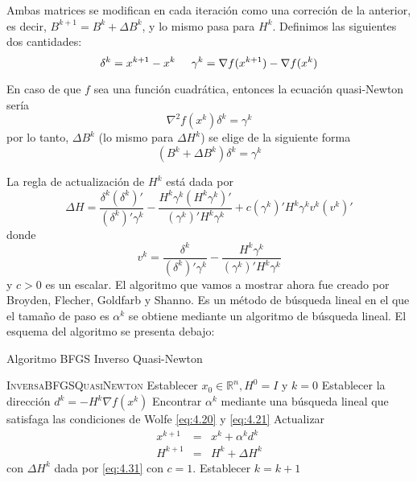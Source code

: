 Ambas matrices se modifican en cada iteración como una correción de la anterior, es decir, $B^{k+1} = B^k + \Delta B^k$, y lo mismo pasa para $H^k$. 
Definimos las siguientes dos cantidades:
\begin{equation*}
\delta^k = x^{k+1} - x^k \hspace{0.5cm} \gamma^k = \nabla f(x^{k+1}) - \nabla f(x^k)
\end{equation*}

En caso de que $f$ sea una función cuadrática, entonces la ecuación quasi-Newton sería
\begin{equation}
\nabla^2 f(x^k)\delta^k = \gamma^k
\label{eq:4.29}
\end{equation}
por lo tanto, $\Delta B^k$ (lo mismo para $\Delta H^k$) se elige de la siguiente forma
\begin{equation}
(B^k + \Delta B^k)\delta^k = \gamma^k
\label{eq:4.30}
\end{equation}

La regla de actualización de $H^k$ está dada por
\begin{equation}
\Delta H = \dfrac{\delta^k(\delta^k)'}{(\delta^k)'\gamma^k} - \dfrac{H^k\gamma^k(H^k\gamma^k)'}{(\gamma^k)'H^k\gamma^k} + c(\gamma^k)'H^k\gamma^kv^k(v^k)'
\label{eq:4.31}
\end{equation}
donde
\begin{equation*}
v^k = \dfrac{\delta^k}{(\delta^k)'\gamma^k} - \dfrac{H^k\gamma^k}{(\gamma^k)'H^k\gamma^k}
\end{equation*}
y $c>0$ es un escalar. 
El algoritmo que vamos a mostrar ahora fue creado por Broyden, Flecher, Goldfarb y Shanno. 
Es un método de búsqueda lineal en el que el tamaño de paso es $\alpha^k$ se obtiene mediante un algoritmo de búsqueda lineal. 
El esquema del algoritmo se presenta debajo:

\begin{algorithm}[H]
\caption{Algoritmo BFGS Inverso Quasi-Newton}\label{alg:BFGSQuasiNewton}
\begin{algorithmic}[1]
\Procedure \textsc{InversaBFGSQuasiNewton}
\State Establecer $x_0\in\mathbb{R}^n, H^0=I$ y $k=0$
	\State Establecer la dirección $d^k = -H^k\nabla f(x^k)$
	\State Encontrar $\alpha^k$ mediante una búsqueda lineal que satisfaga las condiciones de Wolfe \ref{eq:4.20} y \ref{eq:4.21}
	\State Actualizar \begin{equation}
	\begin{matrix}
  x^{k+1} & = & x^k+\alpha^kd^k\\
  H^{k+1} & = & H^k + \Delta H^k
 \end{matrix}
	\end{equation}
	con $\Delta H^k$ dada por \ref{eq:4.31} con $c=1$.
	\State Establecer $k = k+1$
\EndWhile
\EndProcedure
\end{algorithmic}
\end{algorithm}


